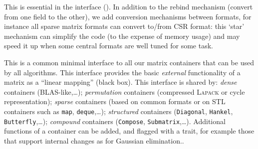 		\begin{comment}
		(\danger We cannot have {\tt const} iterators for all formats
		(see hybrid), walking through a matrix in unspecified order can
		be problematic, for instance, in an hom when a zero may
		alter/change the representation. I don't understand hom more
		than I understand init/rebind by the way, and I won't
		understand it until the morphism is given/chooseable/enforced.
		Rebind is really hom, so why is it in the interface anyway?
		This is the same with getEntry. We don't require it because we
		have a solution. Also, if apply is to be implemented via a
		domain or {\tt mul}, we could stress it is in the interface for
		convenience when writing code only. End of \danger)
		\end{comment}
%
		This is essential in the \applin interface ().
%
		In addition to the rebind mechanism (convert from one field to the other), we add
%
	 conversion mechanisms between formats, for instance all
	 sparse matrix formats can convert to/from CSR format:  this `star'
	 mechanism can simplify the code (to the expense of memory usage) and
	 may speed it up when some central formats  are
	 well tuned for some task.
%
	 \par
%
This is a common minimal interface to all our matrix containers that can be used by all
algorithms. 
This interface provides the basic {\em external} 
functionality of a matrix as a   
 ``linear mapping'' (black box).
This interface is shared by: \emph{dense}
containers (BLAS-like,\ldots); \emph{permutation} containers (compressed
\textsc{Lapack} or cycle representation); \emph{sparse} containers (based on
common formats or on STL containers such as {\tt map}, {\tt deque},\ldots);
\emph{structured} containers ({\tt Diagonal}, {\tt Hankel}, {\tt Butterfly},\ldots);
\emph{compound} containers ({\tt Compose}, {\tt Submatrix},\ldots).
Additional functions of a container can be added, and flagged with a trait, for example those that support internal changes as for Gaussian elimination.. 
%
